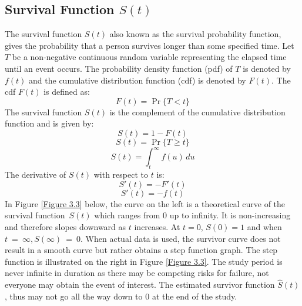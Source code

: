\documentclass[doublespacing,12pt]{report}
\begin{document}
\subsection{\texorpdfstring{Survival Function \( S(t) \)}{Survival Function S(t)}}
The survival function \(S\left(t\right) \) also known as the survival probability function, gives the probability that a person survives longer than some specified time.  Let \(T\) be a non-negative continuous random variable representing the elapsed time until an event occurs. The probability density function (pdf) of \(T\) is denoted by \(f(t)\) and the cumulative distribution function (cdf) is denoted by \(F(t)\). The cdf \(F(t)\) is defined as:
\begin{equation}
F(t) = \Pr\{T < t\}
\end{equation}
The survival function \(S(t)\) is the complement of the cumulative distribution function and is given by:
\begin{equation}
S(t) = 1 - F(t)
\end{equation}
\begin{equation}
S(t) = \Pr\{T \geq t\}
\end{equation}
\begin{equation}
S(t) = \int_t^\infty f(u) \, du
\end{equation}
The derivative of \(S(t)\) with respect to \(t\) is:
\begin{equation}
S'(t) = -F'(t)
\end{equation}
\begin{equation}
S'(t) = -f(t)
\end{equation}
In Figure \ref{Figure 3.3} below, the curve on the left is a theoretical curve of the survival function\ \(S\left(t\right) \) which ranges from 0 up to infinity. It is non-increasing and therefore slopes downward as \(t\) increases. At \(t= 0\), \(S\left(0\right)=1\) and when \( t\ =\ \infty , S\left(\infty\right)\ =\ 0.\) When actual data is used, the survivor curve does not result in a smooth curve but rather obtains a step function graph. The step function is illustrated on the right in Figure \ref{Figure 3.3}.  The study period is never infinite in duration as there may be competing risks for failure, not everyone may obtain the event of interest. The estimated survivor function \(\hat{S}\left(t\right)\), thus may not go all the way down to 0 at the end of the study.
\end{document}
